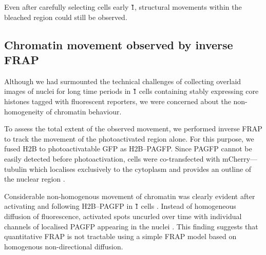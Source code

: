     Even after carefully selecting cells early \G1{},
    structural movements within the bleached region could
    still be observed.



    \subsection{Chromatin movement observed by inverse FRAP}

    Although we had surmounted the technical challenges of collecting
    overlaid images of nuclei for long time periods
    in \G1{} cells containing stably expressing
    core histones tagged with fluorescent reporters,
    we were concerned about the non-homogeneity of chromatin behaviour.

    To assess the total extent of the observed movement,
    we performed inverse FRAP
    to track the movement of the photoactivated region alone.
    For this purpose, we fused H2B to photoactivatable GFP as H2B--PAGFP.
    Since PAGFP cannot be easily detected before photoactivation,
    cells were co-transfected with mCherry--\textalpha--tubulin
    which localises exclusively to the cytoplasm
    and provides an outline of the nuclear region
    .

    Considerable non-homogenous movement of chromatin was clearly evident
    after activating and following H2B--PAGFP in
    \G1{} cells .
    Instead of homogeneous diffusion of fluorescence,
    activated spots uncurled over time with individual channels of
    localised PAGFP appearing in the nuclei .
    This finding suggests that quantitative FRAP is not tractable using
    a simple FRAP model based on homogenous non-directional diffusion.

